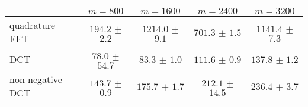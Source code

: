 \centering
\renewcommand{\arraystretch}{1.2}
\begin{tabular}{@{}lcccc@{}}
\toprule
 & $m=800$ & $m=1600$ & $m=2400$ & $m=3200$\\
\midrule
quadrature FFT & $194.2$ $\pm$ $2.2$ & $1214.0$ $\pm$ $9.1$ & $701.3$ $\pm$ $1.5$ & $1141.4$ $\pm$ $7.3$ \\
DCT & $78.0$ $\pm$ $54.7$ & $83.3$ $\pm$ $1.0$ & $111.6$ $\pm$ $0.9$ & $137.8$ $\pm$ $1.2$ \\
non-negative DCT & $143.7$ $\pm$ $0.9$ & $175.7$ $\pm$ $1.7$ & $212.1$ $\pm$ $14.5$ & $236.4$ $\pm$ $3.7$ \\
\bottomrule
\end{tabular}
